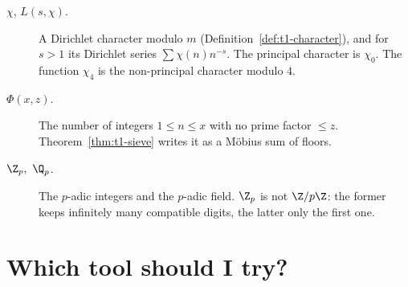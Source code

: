 \begin{description}
\item[$\chi$, $L(s,\chi)$.] A Dirichlet character modulo $m$ (Definition~\ref{def:t1-character}), and for $s>1$ its Dirichlet series $\sum\chi(n)n^{-s}$. The principal character is $\chi_0$. The function $\chi_4$ is the non-principal character modulo $4$.
\item[$\Phi(x,z)$.] The number of integers $1\le n\le x$ with no prime factor $\le z$. Theorem~\ref{thm:t1-sieve} writes it as a M\"obius sum of floors.
\item[$\Z_p,\ \Q_p$.] The $p$-adic integers and the $p$-adic field. $\Z_p$ is not $\Z/p\Z$:
the former keeps infinitely many compatible digits, the latter only the first one.
\end{description}

\section*{Which tool should I try?}
